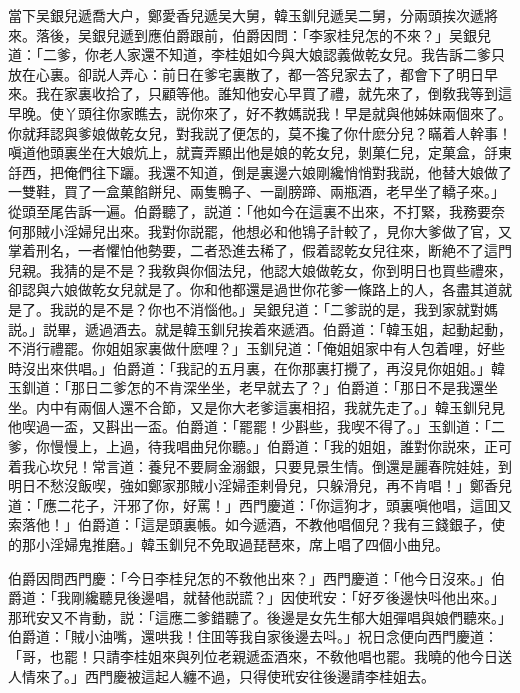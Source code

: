 當下吴銀兒遞喬大户，鄭愛香兒遞吴大舅，韓玉釧兒遞吴二舅，分兩頭挨次遞將來。落後，吴銀兒遞到應伯爵跟前，伯爵因問：「李家桂兒怎的不來？」吴銀兒道：「二爹，你老人家還不知道，李桂姐如今與大娘認義做乾女兒。我告訴二爹只放在心裏。卻説人弄心：前日在爹宅裏散了，都一答兒家去了，都會下了明日早來。我在家裏收拾了，只顧等他。誰知他安心早買了禮，就先來了，倒敎我等到這早晚。使丫頭往你家瞧去，説你來了，好不教媽説我！早是就與他姊妹兩個來了。你就拜認與爹娘做乾女兒，對我説了便怎的，莫不攙了你什麽分兒？瞞着人幹事！嗔道他頭裏坐在大娘炕上，就賣弄顯出他是娘的乾女兒，剝菓仁兒，定菓盒，㧱東㧱西，把俺們往下躧。我還不知道，倒是裏邊六娘剛纔悄悄對我説，他替大娘做了一雙鞋，買了一盒菓餡餅兒、兩隻鴨子、一副膀蹄、兩瓶酒，老早坐了轎子來。」從頭至尾告訴一遍。伯爵聽了，説道：「他如今在這裏不出來，不打緊，我務要奈何那賊小淫婦兒出來。我對你説罷，他想必和他鴇子計較了，見你大爹做了官，又掌着刑名，一者懼怕他勢要，二者恐進去稀了，假着認乾女兒往來，断絶不了這門兒親。我猜的是不是？我敎與你個法兒，他認大娘做乾女，你到明日也買些禮來，卻認與六娘做乾女兒就是了。你和他都還是過世你花爹一條路上的人，各盡其道就是了。我説的是不是？你也不消惱他。」吴銀兒道：「二爹説的是，我到家就對媽説。」説畢，遞過酒去。就是韓玉釧兒挨着來遞酒。伯爵道：「韓玉姐，起動起動，不消行禮罷。你姐姐家裏做什麽哩？」玉釧兒道：「俺姐姐家中有人包着哩，好些時沒出來供唱。」伯爵道：「我記的五月裏，在你那裏打攪了，再沒見你姐姐。」韓玉釧道：「那日二爹怎的不肯深坐坐，老早就去了？」伯爵道：「那日不是我還坐坐。内中有兩個人還不合節，又是你大老爹這裏相招，我就先走了。」韓玉釧兒見他喫過一盃，又斟出一盃。伯爵道：「罷罷！少斟些，我喫不得了。」玉釧道：「二爹，你慢慢上，上過，待我唱曲兒你聽。」伯爵道：「我的姐姐，誰對你説來，正可着我心坎兒！常言道：養兒不要屙金溺銀，只要見景生情。倒還是麗春院娃娃，到明日不愁沒飯喫，強如鄭家那賊小淫婦歪剌骨兒，只躲滑兒，再不肯唱！」鄭香兒道：「應二花子，汗邪了你，好罵！」西門慶道：「你這狗才，頭裏嗔他唱，這囬又索落他！」伯爵道：「這是頭裏帳。如今遞酒，不教他唱個兒？我有三錢銀子，使的那小淫婦鬼推磨。」韓玉釧兒不免取過琵琶來，席上唱了四個小曲兒。

伯爵因問西門慶：「今日李桂兒怎的不敎他出來？」西門慶道：「他今日沒來。」伯爵道：「我剛纔聽見後邊唱，就替他説謊？」因使玳安：「好歹後邊快呌他出來。」那玳安又不肯動，説：「這應二爹錯聽了。後邊是女先生郁大姐彈唱與娘們聽來。」伯爵道：「賊小油嘴，還哄我！住囬等我自家後邊去呌。」祝日念便向西門慶道：「哥，也罷！只請李桂姐來與列位老親遞盃酒來，不敎他唱也罷。我曉的他今日送人情來了。」西門慶被這起人纏不過，只得使玳安往後邊請李桂姐去。

